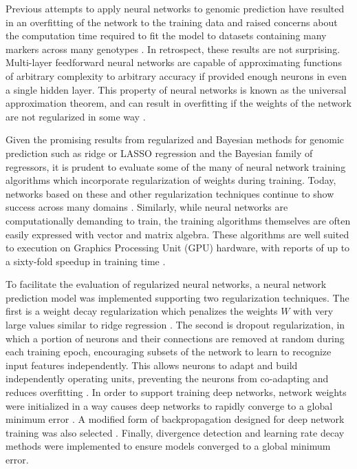 Previous attempts to apply neural networks to genomic prediction have resulted in 
an overfitting of the network to the training data and raised 
concerns about the computation time required to fit the model to datasets containing
many markers across many genotypes \citep{heslot2012, gonzalez-recio2014}. 
In retrospect, these results are not surprising. Multi-layer feedforward neural networks 
are capable of approximating functions of arbitrary complexity to arbitrary 
accuracy if provided enough neurons in even a single hidden 
layer. This property of neural networks is known as the 
universal approximation theorem, and can result in
overfitting if the weights of the network are not regularized in some way \citep{hornik1989}.

Given the promising results from regularized and Bayesian methods for
genomic prediction such as ridge or LASSO regression and the Bayesian family of regressors,
it is prudent to evaluate some of the many of neural network training algorithms which
incorporate regularization of weights during training. Today, networks based on these
and other regularization techniques continue to show success
across many domains \citep{schmidhuber2015}. Similarly, while neural networks are 
computationally demanding to train, the training algorithms 
themselves are often easily expressed with vector and matrix algebra. These algorithms are 
well suited to execution on Graphics Processing Unit (GPU) hardware, with reports 
of up to a sixty-fold speedup in training time \citep{sierra2010, schmidhuber2015}. 

To facilitate the evaluation of regularized neural networks, a neural 
network prediction model was implemented supporting two regularization
techniques. The first is a weight decay regularization which penalizes the 
weights $W$ with very large values similar to ridge regression \citep{krogh1992}.
The second is dropout regularization, in which a portion of neurons and 
their connections are removed at random during each training epoch, 
encouraging subsets of the network to learn to recognize input features 
independently. This allows neurons to adapt and build independently 
operating units, preventing the neurons from co-adapting and reduces 
overfitting \citep{srivastava2014}. In order to support training deep 
networks, network weights were initialized in a way causes deep 
networks to rapidly converge to a global minimum error \citep{glorot2010}. 
A modified form of backpropagation designed for deep network training 
was also selected \citep{dozat2015}. Finally, divergence detection and 
learning rate decay methods were implemented to ensure models converged to
a global minimum error.

